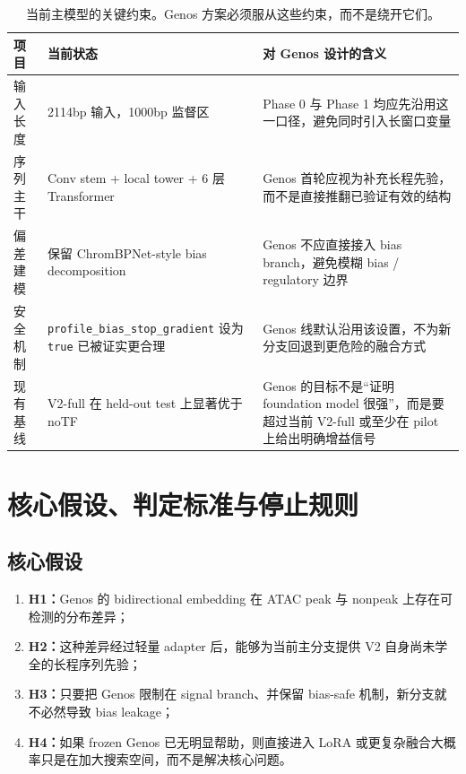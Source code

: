 \documentclass[11pt,a4paper]{ctexart}
\begin{document}
\begin{table}[H]
\centering
\small
\caption{当前主模型的关键约束。Genos 方案必须服从这些约束，而不是绕开它们。}
\label{tab:trans_constraints}
\begin{tabularx}{\textwidth}{l l Y}
\toprule
项目 & 当前状态 & 对 Genos 设计的含义 \\
\midrule
输入长度 & 2114bp 输入，1000bp 监督区 & Phase 0 与 Phase 1 均应先沿用这一口径，避免同时引入长窗口变量 \\
序列主干 & Conv stem + local tower + 6 层 Transformer & Genos 首轮应视为补充长程先验，而不是直接推翻已验证有效的结构 \\
偏差建模 & 保留 ChromBPNet-style bias decomposition & Genos 不应直接接入 bias branch，避免模糊 bias / regulatory 边界 \\
安全机制 & \texttt{profile\_bias\_stop\_gradient} 设为 \texttt{true} 已被证实更合理 & Genos 线默认沿用该设置，不为新分支回退到更危险的融合方式 \\
现有基线 & V2-full 在 held-out test 上显著优于 noTF & Genos 的目标不是“证明 foundation model 很强”，而是要超过当前 V2-full 或至少在 pilot 上给出明确增益信号 \\
\bottomrule
\end{tabularx}
\end{table}

\section{核心假设、判定标准与停止规则}

\subsection{核心假设}

\begin{enumerate}[leftmargin=2em]
  \item \textbf{H1：}Genos 的 bidirectional embedding 在 ATAC peak 与 nonpeak 上存在可检测的分布差异；
  \item \textbf{H2：}这种差异经过轻量 adapter 后，能够为当前主分支提供 V2 自身尚未学全的长程序列先验；
  \item \textbf{H3：}只要把 Genos 限制在 signal branch、并保留 bias-safe 机制，新分支就不必然导致 bias leakage；
  \item \textbf{H4：}如果 frozen Genos 已无明显帮助，则直接进入 LoRA 或更复杂融合大概率只是在加大搜索空间，而不是解决核心问题。
\end{enumerate}
\end{document}
